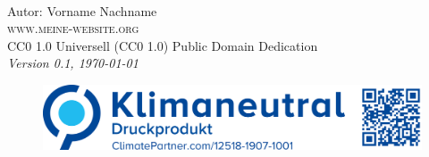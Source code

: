\newpage
~\vfill
\thispagestyle{empty}

\noindent Autor: Vorname Nachname\\

\noindent \textsc{www.meine-website.org}\\

\noindent \ccLogo \hspace{0.1cm} \ccZero \hspace{0.1cm} CC0 1.0 Universell (CC0 1.0) Public Domain Dedication \\

\noindent \textit{Version 0.1, \today}

\begin{figure}[htb]
\includegraphics[scale=0.15]{climate}
\end{figure}

